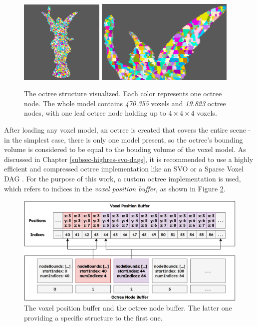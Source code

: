 \begin{figure}[h]
    \centering
    \includegraphics[width=151.5px]{images/graphics/lucy-voxel-octree-viz.jpg}
    \includegraphics[width=250px]{images/graphics/lucy-voxel-octree-viz-2.jpg}
    \caption{The octree structure visualized. Each color represents one octree node. The whole model contains 
    \emph{470.355} voxels and \emph{19.823} octree nodes, with one leaf octree node holding up to \begin{math} 4 \times 4 \times 4 \end{math}
    voxels.}
    \label{fig:voxel-octree-viz}
\end{figure}

\noindent
After loading any voxel model, an octree is created that covers the entire scene - in the simplest case, there is 
only one model present, so the octree's bounding volume is considered to be equal to the bouding volume of the voxel 
model. As discussed in Chapter \ref{subsec-highres-svo-dags}, it is recommended to use a highly efficient and 
compressed octree implementation like an \ac{SVO} or a Sparse Voxel \ac{DAG} \cite{Kampe2013}. For the purpose of 
this work, a custom octree implementation is used, which refers to indices in the \emph{voxel position buffer}, 
as shown in Figure \ref{fig:voxelpos-octreenode-buffer}. \\

\begin{figure}[h]
    \centering
    \includegraphics[width=\linewidth]{images/graphics/voxelpos-octreenode-buffer.jpg}
    \caption{The voxel position buffer and the octree node buffer. The latter one providing a 
    specific structure to the first one.}
    \label{fig:voxelpos-octreenode-buffer}
\end{figure}

